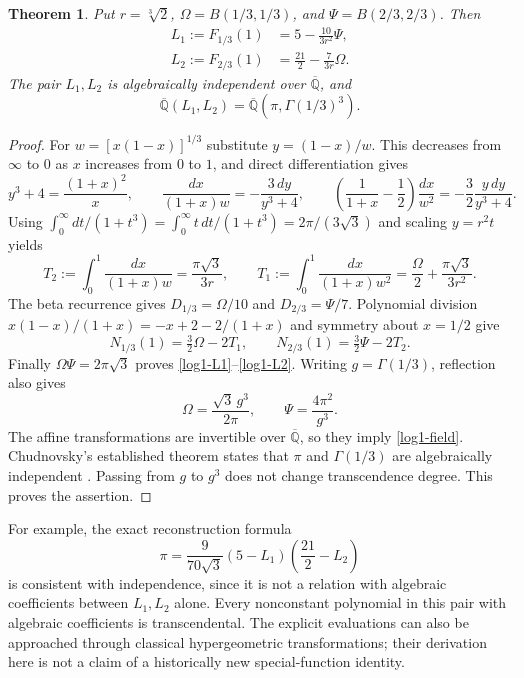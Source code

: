 \documentclass[11pt,a4paper]{article}
\newtheorem{theorem}{Theorem}[section]
\theoremstyle{definition}
\theoremstyle{remark}
\numberwithin{equation}{section}
\begin{document}
\begin{theorem}\label{log1-explicit-thirds}
Put $r=\sqrt[3]{2}$, $\Omega=B(1/3,1/3)$, and
$\Psi=B(2/3,2/3)$. Then
\begin{align}
 L_1:=F_{1/3}(1)&=5-\frac{10}{3r^2}\Psi,\label{log1-L1}\\
 L_2:=F_{2/3}(1)&=\frac{21}{2}-\frac7{3r}\Omega.\label{log1-L2}
\end{align}
The pair $L_1,L_2$ is algebraically independent over
$\overline{\mathbb Q}$, and
\begin{equation}\label{log1-field}
 \overline{\mathbb Q}(L_1,L_2)
 =\overline{\mathbb Q}(\pi,\Gamma(1/3)^3).
\end{equation}
\end{theorem}
\begin{proof}
For $w=[x(1-x)]^{1/3}$ substitute $y=(1-x)/w$. This decreases from
$\infty$ to $0$ as $x$ increases from $0$ to $1$, and direct
differentiation gives
\[
 y^3+4=\frac{(1+x)^2}{x},\qquad
 \frac{dx}{(1+x)w}=-\frac{3\,dy}{y^3+4},\qquad
 \left(\frac1{1+x}-\frac12\right)\frac{dx}{w^2}
 =-\frac32\frac{y\,dy}{y^3+4}.
\]
Using $\int_0^\infty dt/(1+t^3)=\int_0^\infty t\,dt/(1+t^3)
=2\pi/(3\sqrt3)$ and scaling $y=r^2t$ yields
\[
 T_2:=\int_0^1\frac{dx}{(1+x)w}=\frac{\pi\sqrt3}{3r},\qquad
 T_1:=\int_0^1\frac{dx}{(1+x)w^2}
 =\frac\Omega2+\frac{\pi\sqrt3}{3r^2}.
\]
The beta recurrence gives $D_{1/3}=\Omega/10$ and $D_{2/3}=\Psi/7$.
Polynomial division
$x(1-x)/(1+x)=-x+2-2/(1+x)$ and symmetry about $x=1/2$ give
\[
 N_{1/3}(1)=\tfrac32\Omega-2T_1,\qquad
 N_{2/3}(1)=\tfrac32\Psi-2T_2.
\]
Finally $\Omega\Psi=2\pi\sqrt3$ proves
\eqref{log1-L1}--\eqref{log1-L2}. Writing $g=\Gamma(1/3)$, reflection
also gives
\[
 \Omega=\frac{\sqrt3\,g^3}{2\pi},\qquad
 \Psi=\frac{4\pi^2}{g^3}.
\]
The affine transformations are invertible over $\overline{\mathbb Q}$,
so they imply \eqref{log1-field}. Chudnovsky's established theorem
states that $\pi$ and $\Gamma(1/3)$ are algebraically independent
\cite[p.~344, equation~(9)]{log1-chudnovsky}. Passing from $g$ to $g^3$
does not change transcendence degree. This proves the assertion.
\end{proof}

For example, the exact reconstruction formula
\[
 \pi=\frac9{70\sqrt3}(5-L_1)\left(\frac{21}{2}-L_2\right)
\]
is consistent with independence, since it is not a relation with
algebraic coefficients between $L_1,L_2$ alone. Every nonconstant
polynomial in this pair with algebraic coefficients is transcendental.
The explicit evaluations can also be approached through classical
hypergeometric transformations; their derivation here is not a claim
of a historically new special-function identity.
\end{document}
